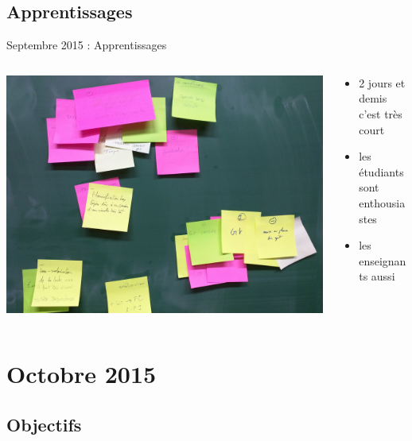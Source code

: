 \documentclass{beamer}
\begin{document}
\subsection{Apprentissages}
\begin{frame}{Septembre 2015 : Apprentissages}
  \begin{columns}
    \begin{column}{0.5\textwidth}
      \begin{center}
        \includegraphics[width=\textwidth]{includes/201509_retro.jpg}      
      \end{center}
    \end{column}
    \begin{column}{0.5\textwidth}
  \begin{itemize}
    \item 2 jours et demis c'est très court
    \item les étudiants sont enthousiastes
    \item les enseignants aussi
  \end{itemize}
    \end{column}
  \end{columns}
\end{frame}

\section{Octobre 2015}
\subsection{Objectifs}
\end{document}
